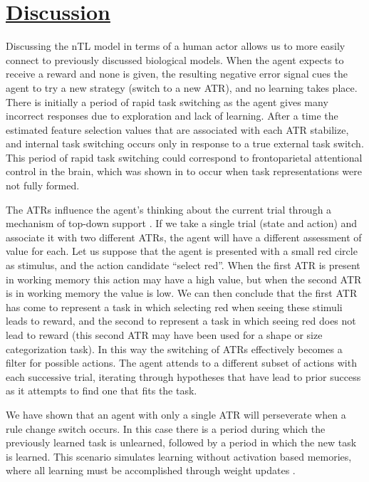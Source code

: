 \documentclass[10pt,letterpaper]{article}
\begin{document}
\section{\underline{Discussion}}

Discussing the nTL model in terms of a human actor allows us to more easily connect to previously discussed biological models. When the agent expects to receive a reward and none is given, the resulting negative error signal cues the agent to try a new strategy (switch to a new ATR), and no learning takes place. There is initially a period of rapid task switching as the agent gives many incorrect responses due to exploration and lack of learning. After a time the estimated feature selection values that are associated with each ATR stabilize, and internal task switching occurs only in response to a true external task switch. This period of rapid task switching could correspond to frontoparietal attentional control in the brain, which was shown in \cite{niv_reinforcement_2015} to occur when task representations were not fully formed.

The ATRs influence the agent's thinking about the current trial through a mechanism of top-down support \cite{oreilly_prefrontal_2002}. If we take a single trial (state and action) and associate it with two different ATRs, the agent will have a different assessment of value for each. Let us suppose that the agent is presented with a small red circle as stimulus, and the action candidate ``select red''. When the first ATR is present in working memory this action may have a high value, but when the second ATR is in working memory the value is low. We can then conclude that the first ATR has come to represent a task in which selecting red when seeing these stimuli leads to reward, and the second to represent a task in which seeing red does not lead to reward (this second ATR may have been used for a shape or size categorization task). In this way the switching of ATRs effectively becomes a filter for possible actions. The agent attends to a different subset of actions with each successive trial, iterating through hypotheses that have lead to prior success as it attempts to find one that fits the task.

We have shown that an agent with only a single ATR will perseverate when a rule change switch occurs. In this case there is a period during which the previously learned task is unlearned, followed by a period in which the new task is learned. This scenario simulates learning without activation based memories, where all learning must be accomplished through weight updates \cite{oreilly_prefrontal_2002}.
\end{document}
